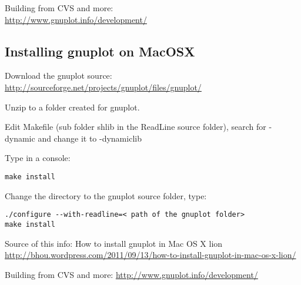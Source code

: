\documentclass[a4paper,10pt]{amsart}
\begin{document}
Building from CVS and more:\\
\url{http://www.gnuplot.info/development/}


\subsection{Installing gnuplot on MacOSX\\}

Download the gnuplot source:\\
\url{http://sourceforge.net/projects/gnuplot/files/gnuplot/}

Unzip to a folder created for gnuplot.

Edit Makefile (sub folder shlib in the ReadLine source folder), search for -dynamic and change it to -dynamiclib

Type in a console:
\begin{verbatim}make install\end{verbatim}

Change the directory to the gnuplot source folder, type:
\begin{verbatim}./configure --with-readline=< path of the gnuplot folder>
make install\end{verbatim}

Source of this info:
How to install gnuplot in Mac OS X lion
\url{http://bhou.wordpress.com/2011/09/13/how-to-install-gnuplot-in-mac-os-x-lion/}

Building from CVS and more:
\url{http://www.gnuplot.info/development/}
\end{document}
